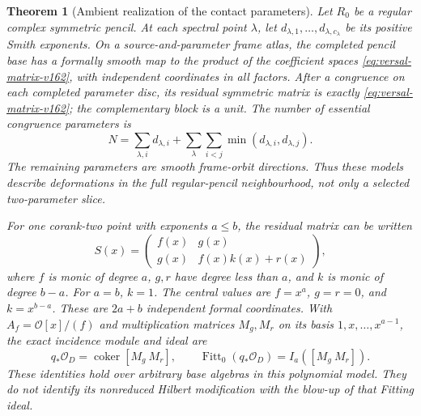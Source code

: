 \documentclass[11pt,reqno]{amsart}
\numberwithin{equation}{section}
\newtheorem{theorem}{Theorem}[section]
\theoremstyle{definition}\newtheorem{definition}[theorem]{Definition}
\theoremstyle{remark}\newtheorem{remark}[theorem]{Remark}
\newcommand{\OO}{\mathcal O}\newcommand{\II}{\mathcal I}
\DeclareMathOperator{\Fitt}{Fitt}\DeclareMathOperator{\Ann}{Ann}
\begin{document}
\begin{theorem}[Ambient realization of the contact parameters]
\label{thm:ambient-versal-v162}
Let $R_0$ be a regular complex symmetric pencil. At each spectral
point $\lambda$, let $d_{\lambda,1},\ldots,d_{\lambda,c_\lambda}$
be its positive Smith exponents. On a source-and-parameter frame atlas,
the completed pencil base has a formally smooth map to the product
of the coefficient spaces \eqref{eq:versal-matrix-v162}, with
independent coordinates in all factors. After a congruence on each
completed parameter disc, its residual symmetric matrix is exactly
\eqref{eq:versal-matrix-v162}; the complementary block is a unit.
The number of essential congruence parameters is
\begin{equation}\label{eq:versal-dimension-v162}
 N=\sum_{\lambda,i}d_{\lambda,i}
       +\sum_\lambda\sum_{i<j}\min(d_{\lambda,i},d_{\lambda,j}).
\end{equation}
The remaining parameters are smooth frame-orbit directions. Thus
these models describe deformations in the full regular-pencil
neighbourhood, not only a selected two-parameter slice.

For one corank-two point with exponents $a\leq b$, the residual
matrix can be written
\begin{equation}\label{eq:Euclidean-normal-v162}
 S(x)=\begin{pmatrix}f(x)&g(x)\\g(x)&f(x)k(x)+r(x)\end{pmatrix},
\end{equation}
where $f$ is monic of degree $a$, $g,r$ have degree less than $a$,
and $k$ is monic of degree $b-a$. For $a=b$, $k=1$.
The central values are $f=x^a$, $g=r=0$, and $k=x^{b-a}$.
These are $2a+b$ independent formal coordinates. With
$A_f=\OO[x]/(f)$ and multiplication matrices $M_g,M_r$ on its
basis $1,x,\ldots,x^{a-1}$, the exact incidence module and ideal are
\begin{equation}\label{eq:versal-incidence-v162}
 q_*\OO_D=\operatorname{coker}[M_g\ M_r],\qquad
 \Fitt_0(q_*\OO_D)=I_a([M_g\ M_r]).
\end{equation}
These identities hold over arbitrary base algebras in this polynomial
model. They do not identify its nonreduced Hilbert modification with
the blow-up of that Fitting ideal.
\end{theorem}
\end{document}
